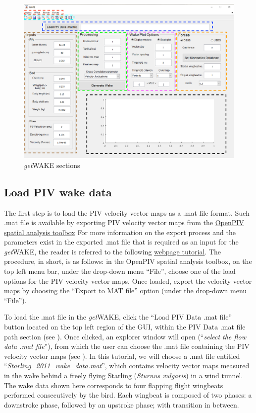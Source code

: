 \documentclass[12pt,a4paper]{article}
\begin{document}
\begin{figure}[ht!]
	\centering
	\includegraphics[width=\textwidth]{‏‏open_window_marked_regions}
	\caption{\textit{get}WAKE sections}
	\label{fig:GUI-sections}
\end{figure}	

	

\subsection{Load PIV wake data}

The first step is to load the PIV velocity vector maps as a .mat file format. 
Such .mat file is available by exporting PIV velocity vector maps from the \href{https://github.com/OpenPIV/openpiv-spatial-analysis-toolbox}{OpenPIV spatial analysis toolbox} 
For more information on the export process and the parameters exist in the exported .mat file that is required as an input for the \textit{get}WAKE, the reader is referred to the following \href{https://github.com/OpenPIV/openpiv-spatial-analysis-toolbox/blob/master/docs/tutorial.rst}{webpage tutorial}.
The procedure, in short, is as follows: in the OpenPIV spatial analysis toolbox, on the top left menu bar, under the drop-down menu ``File'', choose one of the load options for the PIV velocity vector maps. Once loaded, export the velocity vector maps by choosing the ``Export to MAT file'' option (under the drop-down menu ``File'').

To load the .mat file in the \textit{get}WAKE, click the ``Load PIV Data .mat file'' button located on the top left region of the GUI, within the PIV Data .mat file path section (see ). 
Once clicked, an explorer window will open (``\textit{select the flow data .mat file}''), from which the user can choose the .mat file containing the PIV velocity vector maps (see ). 
In this tutorial, we will choose a .mat file entitled ``\textit{Starling\_2011\_wake\_data.mat}'', which contains velocity vector maps measured in the wake behind a freely flying Starling (\textit{Sturnus vulgaris}) in a wind tunnel. 
The wake data shown here corresponds to four flapping flight wingbeats performed consecutively by the bird. 
Each wingbeat is composed of two phases: a downstroke phase, followed by an upstroke phase; with transition in between.
\end{document}
